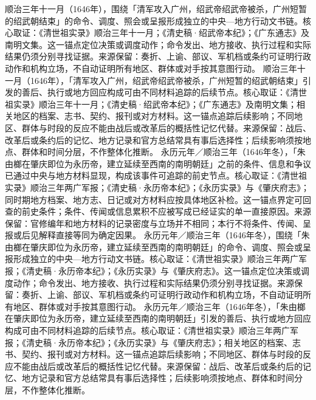 顺治三年十一月（1646年），围绕「清军攻入广州，绍武帝绍武帝被杀，广州短暂的绍武朝结束」的命令、调度、照会或呈报形成独立的中央—地方行动文书链。核心取证：《清世祖实录》顺治三年十一月；《清史稿·绍武帝本纪》；《广东通志》及南明文集。这一锚点定位决策或调度动作；命令发出、地方接收、执行过程和实际结果仍须分别寻找证据。来源保留：奏折、上谕、部议、军机档或条约可证明行政动作和机构立场，不自动证明所有地区、群体或对手按其意图行动。
顺治三年十一月（1646年），「清军攻入广州，绍武帝绍武帝被杀，广州短暂的绍武朝结束」引发的善后、执行或地方回应构成可由不同材料追踪的后续节点。核心取证：《清世祖实录》顺治三年十一月；《清史稿·绍武帝本纪》；《广东通志》及南明文集；相关地区的档案、志书、契约、报刊或对方材料。这一锚点追踪后续影响；不同地区、群体与时段的反应不能由战后或改革后的概括性记忆代替。来源保留：战后、改革后或条约后的记忆、地方记录和官方总结常具有事后选择性；后续影响须按地点、群体和时间分层，不作整体化推断。
永历元年／顺治三年（1646年冬），「朱由榔在肇庆即位为永历帝，建立延续至西南的南明朝廷」之前的条件、信息和争议已通过中央与地方材料显现，构成该事件可追踪的前史节点。核心取证：《清世祖实录》顺治三年两广军报；《清史稿·永历帝本纪》；《永历实录》与《肇庆府志》；同时期地方档案、地方志、日记或对方材料应按具体地区补检。这一锚点界定可回查的前史条件；条件、传闻或信息累积不应被写成已经证实的单一直接原因。来源保留：官修编年和地方材料的记录密度与立场并不相同；本行不将条件、传闻、呈报或后见解释直接等同为确定因果。
永历元年／顺治三年（1646年冬），围绕「朱由榔在肇庆即位为永历帝，建立延续至西南的南明朝廷」的命令、调度、照会或呈报形成独立的中央—地方行动文书链。核心取证：《清世祖实录》顺治三年两广军报；《清史稿·永历帝本纪》；《永历实录》与《肇庆府志》。这一锚点定位决策或调度动作；命令发出、地方接收、执行过程和实际结果仍须分别寻找证据。来源保留：奏折、上谕、部议、军机档或条约可证明行政动作和机构立场，不自动证明所有地区、群体或对手按其意图行动。
永历元年／顺治三年（1646年冬），「朱由榔在肇庆即位为永历帝，建立延续至西南的南明朝廷」引发的善后、执行或地方回应构成可由不同材料追踪的后续节点。核心取证：《清世祖实录》顺治三年两广军报；《清史稿·永历帝本纪》；《永历实录》与《肇庆府志》；相关地区的档案、志书、契约、报刊或对方材料。这一锚点追踪后续影响；不同地区、群体与时段的反应不能由战后或改革后的概括性记忆代替。来源保留：战后、改革后或条约后的记忆、地方记录和官方总结常具有事后选择性；后续影响须按地点、群体和时间分层，不作整体化推断。
